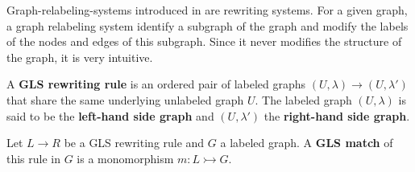 Graph-relabeling-systems introduced in \cite{litovsky1999graph} are rewriting systems. For a given graph, a graph relabeling system identify a subgraph of the graph and modify the labels of the nodes and edges of this subgraph. Since it never modifies the structure of the graph, it is very intuitive.

\begin{definition}[Rule]
  \label{def:gls_rule}
  A \textbf{GLS rewriting rule} is an ordered pair of labeled graphs \( (U,\lambda) \mathop{\to} (U, \lambda') \) that share the same underlying unlabeled graph \( U \). The labeled graph \( (U, \lambda) \) is said to be the \textbf{left-hand side graph} and \( (U, \lambda')\) the \textbf{right-hand side graph}.
\end{definition} 
 
\begin{definition}[Match]
  \label{def:gls_match}
  Let \( L \mathop{\to} R \) be a GLS rewriting rule and \( G \) a labeled graph.
  A \textbf{GLS match} of this rule in \( G \) is a monomorphism \( m : L \rightarrowtail G \).
\end{definition}



